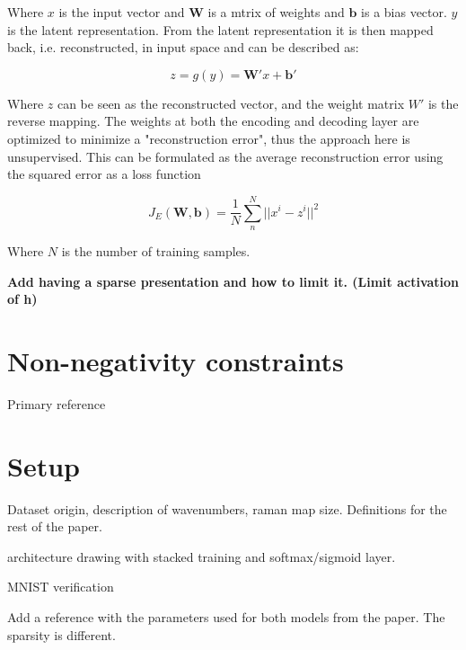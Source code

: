 \documentclass{article}
\begin{document}
Where $x$ is the input vector and $\mathbf{W}$ is a mtrix of weights and $\mathbf{b}$ is a bias vector. $y$ is the latent representation. From the latent representation it is then mapped back, i.e. reconstructed, in input space and can be described as:

\begin{equation}
z = g(y) = \mathbf{W'}x + \mathbf{b'}
\end{equation}

Where $z$ can be seen as the reconstructed vector, and the weight matrix $W'$ is the reverse mapping. The weights at both the encoding and decoding layer are optimized to minimize a "reconstruction error", thus the approach here is unsupervised. This can be formulated as the average reconstruction error using the squared error as a loss function

\begin{equation}
J_E(\mathbf{W},\mathbf{b}) = \frac{1}{N} \sum_n^N || x^i - z^i || ^2
\end{equation}

Where $N$ is the number of training samples. 

\textbf{Add having a sparse presentation and how to limit it. (Limit activation of h)}

\section{Non-negativity constraints}
\label{sec:prior}

%



Primary reference \cite{Hosseini-Asl2016}

\section{Setup}
\label{sec:setup}

Dataset origin, description of wavenumbers, raman map size. Definitions for the rest of the paper.

architecture drawing with stacked training and softmax/sigmoid layer.

MNIST verification

Add a reference with the parameters used for both models from the paper. The sparsity is different.
\end{document}
